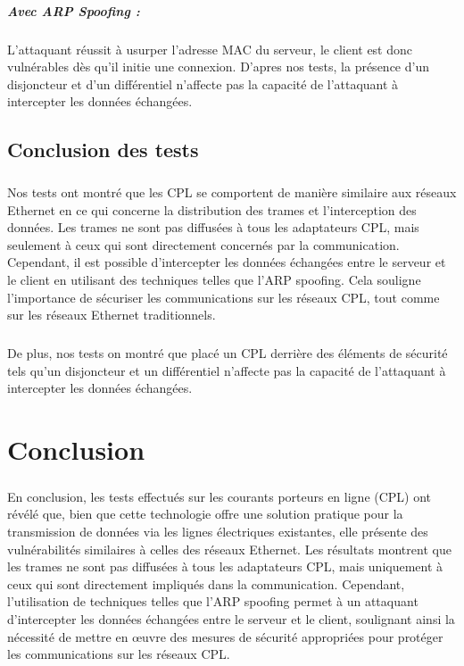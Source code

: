 \documentclass[a4paper,twocolumn]{report}
\begin{document}
\paragraph{Avec ARP Spoofing :}
L'attaquant réussit à usurper l'adresse MAC du serveur, le client est donc vulnérables dès qu'il initie une connexion.
D'apres nos tests, la présence d'un disjoncteur et d'un différentiel n'affecte pas la capacité de l'attaquant à intercepter les données échangées.


\section{Conclusion des tests}
\paragraph{}Nos tests ont montré que les CPL se comportent de manière similaire
aux réseaux Ethernet en ce qui concerne la distribution des trames et l'interception des données.
Les trames ne sont pas diffusées à tous les adaptateurs CPL, mais seulement
à ceux qui sont directement concernés par la communication. Cependant,
il est possible d'intercepter les données échangées entre le serveur et le client
en utilisant des techniques telles que l'ARP spoofing. Cela souligne l'importance de
sécuriser les communications sur les réseaux CPL, tout comme sur les réseaux Ethernet traditionnels.
\paragraph{}De plus, nos tests on montré que placé un CPL derrière des éléments de sécurité tels qu'un disjoncteur et un différentiel n'affecte pas la capacité de l'attaquant à intercepter les données échangées.

\chapter{Conclusion}

\paragraph{}En conclusion, les tests effectués sur les courants porteurs
en ligne (CPL) ont révélé que, bien que cette technologie offre une solution
pratique pour la transmission de données via les lignes électriques existantes,
elle présente des vulnérabilités similaires à celles des réseaux Ethernet.
Les résultats montrent que les trames ne sont pas diffusées à tous les adaptateurs CPL,
mais uniquement à ceux qui sont directement impliqués dans la communication. Cependant,
l'utilisation de techniques telles que l'ARP spoofing permet à un attaquant d'intercepter
les données échangées entre le serveur et le client, soulignant ainsi la nécessité de
mettre en œuvre des mesures de sécurité appropriées pour protéger les communications sur les réseaux CPL.
\end{document}
